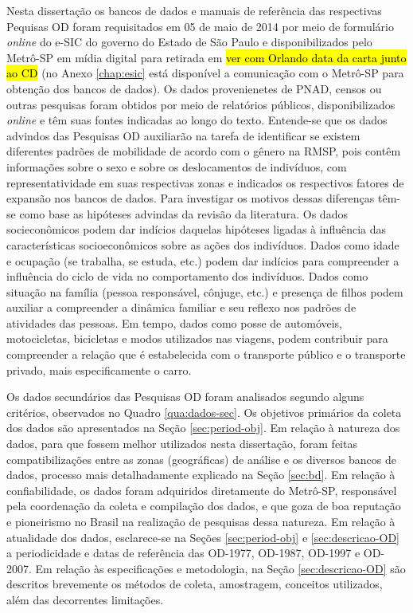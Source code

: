 Nesta dissertação os bancos de dados e manuais de referência das respectivas Pequisas OD foram requisitados em 05 de maio de 2014 por meio de formulário \emph{online} do e-SIC do governo do Estado de São Paulo e disponibilizados pelo Metrô-SP em mídia digital para retirada em \hl{ver com Orlando data da carta junto ao CD} (no Anexo \ref{chap:esic} está disponível a comunicação com o Metrô-SP para obtenção dos bancos de dados). Os dados provenienetes de PNAD, censos ou outras pesquisas foram obtidos por meio de relatórios públicos, disponibilizados \emph{online} e têm suas fontes indicadas ao longo do texto. Entende-se que os dados advindos das Pesquisas OD auxiliarão na tarefa de identificar se existem diferentes padrões de mobilidade de acordo com o gênero na RMSP, pois contêm informações sobre o sexo e sobre os deslocamentos de indivíduos, com representatividade em suas respectivas zonas e indicados os respectivos fatores de expansão nos bancos de dados. Para investigar os motivos dessas diferenças têm-se como base as hipóteses advindas da revisão da literatura. Os dados socieconômicos podem dar indícios daquelas hipóteses ligadas à influência das características socioeconômicos sobre as ações dos indivíduos. Dados como idade e ocupação (se trabalha, se estuda, etc.) podem dar indícios para compreender a influência do ciclo de vida no comportamento dos indivíduos. Dados como situação na família (pessoa responsável, cônjuge, etc.) e presença de filhos podem auxiliar a compreender a dinâmica familiar e seu reflexo nos padrões de atividades das pessoas. Em tempo, dados como posse de automóveis, motocicletas, bicicletas e modos utilizados nas viagens, podem contribuir para compreender a relação que é estabelecida com o transporte público e o transporte privado, mais especificamente o carro. 

Os dados secundários das Pesquisas OD foram analisados segundo alguns critérios, observados no Quadro \ref{qua:dados-sec}. Os objetivos primários da coleta dos dados são apresentados na Seção \ref{sec:period-obj}. Em relação à natureza dos dados, para que fossem melhor utilizados nesta dissertação, foram feitas compatibilizações entre as zonas (geográficas) de análise e os diversos bancos de dados, processo mais detalhadamente explicado na Seção \ref{sec:bd}. Em relação à confiabilidade, os dados foram adquiridos diretamente do Metrô-SP, responsável pela coordenação da coleta e compilação dos dados, e que goza de boa reputação e pioneirismo no Brasil na realização de pesquisas dessa natureza. Em relação à atualidade dos dados, esclarece-se na Seções \ref{sec:period-obj} e \ref{sec:descricao-OD} a periodicidade e datas de referência das OD-1977, OD-1987, OD-1997 e OD-2007. Em relação às especificações e metodologia, na Seção \ref{sec:descricao-OD} são descritos brevemente os métodos de coleta, amostragem, conceitos utilizados, além das decorrentes limitações.

